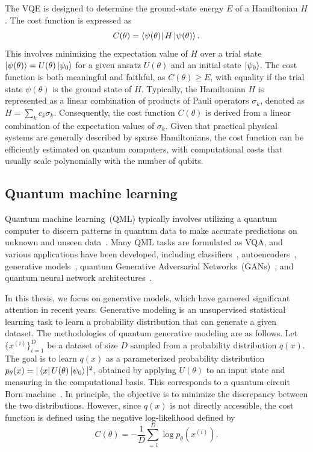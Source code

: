 \documentclass[12pt,dvipdfmx,twoside,openright]{report}
\begin{document}
The VQE is designed to determine the ground-state energy $E$ of a Hamiltonian $H$.
The cost function is expressed as 
\begin{equation}
    C(\theta)=\bra{\psi(\theta)}H\ket{\psi(\theta)}.
\end{equation}
This involves minimizing the expectation value of $H$ over a trial state $\ket{\psi(\theta)}=U(\theta)\ket{\psi_0}$ for a given ansatz $U(\theta)$ and an initial state $\ket{\psi_0}$.
The cost function is both meaningful and faithful, as $C(\theta)\ge E$, with equality if the trial state $\psi(\theta)$ is the ground state of $H$. 
Typically, the Hamiltonian $H$ is represented as a linear combination of products of Pauli operators $\sigma_k$, denoted as $H=\sum_k c_k \sigma_k$.
Consequently, the cost function $C(\theta)$ is derived from a linear combination of the expectation values of $\sigma_k$. 
Given that practical physical systems are generally described by sparse Hamiltonians, the cost function can be efficiently estimated on quantum computers, with computational costs that usually scale polynomially with the number of qubits.



\subsection{Quantum machine learning}
Quantum machine learning~(QML) typically involves utilizing a quantum computer to discern patterns in quantum data to make accurate predictions on unknown and unseen data~\cite{qml0}. 
Many QML tasks are formulated as VQA, and various applications have been developed, including classifiers~\cite{qml1,qml2}, autoencoders~\cite{q-autoencoder}, generative models~\cite{q-generative,born-machine}, quantum Generative Adversarial Networks~(GANs)~\cite{q-gan}, and quantum neural network architectures~\cite{q-nn}.

In this thesis, we focus on generative models, which have garnered significant attention in recent years.
Generative modeling is an unsupervised statistical learning task to learn a probability distribution that can generate a given dataset.
The methodologies of quantum generative modeling are as follows.
Let $\{x^{(i)}\}_{i=1}^D$ be a dataset of size $D$ sampled from a probability distribution $q(x)$.
The goal is to learn $q(x)$ as a parameterized probability distribution $p_\theta(x)=|\bra{x}U(\theta)\ket{\psi_0}|^2$, obtained by applying $U(\theta)$ to an input state and measuring in the computational basis.
This corresponds to a quantum circuit Born machine~\cite{born-machine}.
In principle, the objective is to minimize the discrepancy between the two distributions.
However, since $q(x)$ is not directly accessible, the cost function is defined using the negative log-likelihood defined by
\begin{equation}
    C(\theta)=-\frac{1}{D}\sum_{=1}^D \log{p_\theta (x^{(i)})}.
\end{equation}
\end{document}
